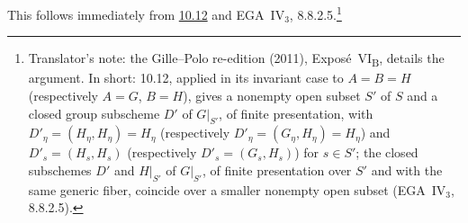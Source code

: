 This follows immediately from \hyperref[prop:sga3-VIB-10.12]{10.12} and
EGA~IV\(_3\), 8.8.2.5.\footnote{Translator's note: the Gille--Polo re-edition (2011),
Expos\'e~VI\textsubscript{B}, details the argument. In short: 10.12, applied in its invariant case to \(A=B=H\)
\textup{(}respectively \(A=G\), \(B=H\)\textup{)}, gives a nonempty open subset \(S'\) of \(S\) and a closed group
subscheme \(D'\) of \(G|_{S'}\), of finite presentation, with \(D'_\eta=(H_\eta,H_\eta)=H_\eta\)
\textup{(}respectively \(D'_\eta=(G_\eta,H_\eta)=H_\eta\)\textup{)} and \(D'_s=(H_s,H_s)\) \textup{(}respectively
\(D'_s=(G_s,H_s)\)\textup{)} for \(s\in S'\); the closed subschemes \(D'\) and \(H|_{S'}\) of \(G|_{S'}\), of finite
presentation over \(S'\) and with the same generic fiber, coincide over a smaller nonempty open subset
(EGA~IV\(_3\), 8.8.2.5).}
